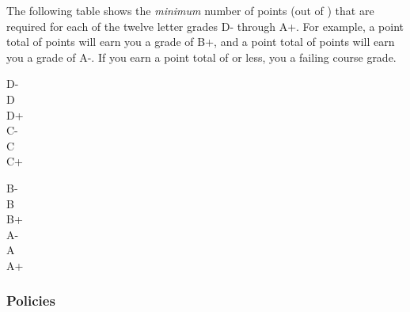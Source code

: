\documentclass[12pt,fullpage]{article}
\newcounter{ex}\setcounter{ex}{0}
\newenvironment{mypar}[2]
  {\begin{list}{}%
    {\setlength\leftmargin{#1}
    \setlength\rightmargin{#2}}
    \item[]}
  {\end{list}}
\begin{document}
 
 The following table shows the \emph{minimum} number of points (out of \points) that
 are required for each of the twelve letter grades D- through A+. For
 example, a point total of \Bp\/  points will earn you a grade of B+,  and 
 a point total of \Am\/ points will earn you a grade of A-. If you earn a point
 total of \F\/  or less, you a failing course grade.
  
  \vspace{0.1in}
      \begin{minipage}{5.5in}
   \centering 
 \begin{mypar}{0.25in}{0.25in}
     \begin{minipage}{2.5in}
         D-  \dotfill \Dm \\
         D \dotfill \D \\
         D+ \dotfill \Dp \\
         C- \dotfill \Cm  \\
         C \dotfill \C \\
         C+ \dotfill \Cp 
         \end{minipage}
     \phantom{xxx}
     \begin{minipage}{2.5in}
         B- \dotfill \Bm \\
         B \dotfill  \B \\
         B+ \dotfill  \Bp\\
         A- \dotfill  \Am \\
         A \dotfill  \A \\
         A+ \dotfill  \Ap
     \end{minipage}
 \end{mypar} 
 \end{minipage}




\subsubsection* {Policies}
\end{document}
